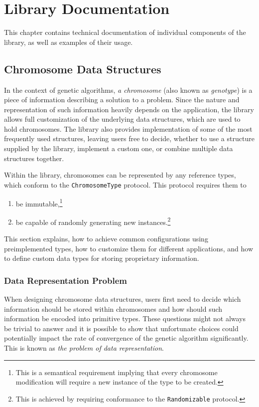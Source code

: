 \chapter{Library Documentation}
This chapter contains technical documentation of individual components of the library, as well as examples of their usage.

\section{Chromosome Data Structures}
In the context of genetic algorithms, \textit{a chromosome} (also known as \textit{genotype}) is a piece of information describing a solution to a problem. Since the nature and representation of such information heavily depends on the application, the library allows full customization of the underlying data structures, which are used to hold chromosomes. The library also provides implementation of some of the most frequently used structures, leaving users free to decide, whether to use a structure supplied by the library, implement a custom one, or combine multiple data structures together.

Within the library, chromosomes can be represented by any reference types, which conform to the \texttt{ChromosomeType} protocol. This protocol requires them to
~
\begin{enumerate}
	\item be immutable,\footnote{This is a semantical requirement implying that every chromosome modification will require a new instance of the type to be created.}
	\item be capable of randomly generating new instances.\footnote{This is achieved by requiring conformance to the \texttt{Randomizable} protocol.}
\end{enumerate}

This section explains, how to achieve common configurations using preimplemented types, how to customize them for different applications, and how to define custom data types for storing proprietary information.

\subsection{Data Representation Problem}
When designing chromosome data structures, users first need to decide which information should be stored within chromosomes and how should such information be encoded into primitive types. These questions might not always be trivial to answer and it is possible to show that 
unfortunate choices could potentially impact the rate of convergence of the genetic algorithm significantly. This is known as \textit{the problem of data representation}.

